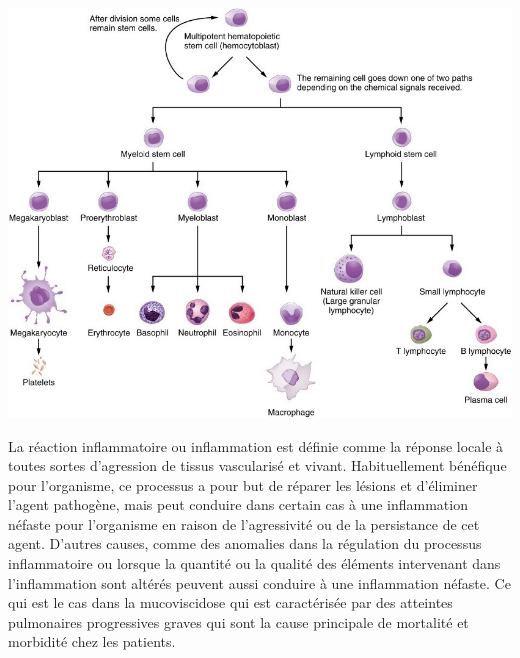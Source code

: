 \begin{center}
\includegraphics[scale=1]{gfx/inflammation.jpg} 
       \label{inflammation}
\end{center}

La réaction inflammatoire ou inflammation est définie comme la réponse locale à toutes sortes d’agression de tissus vascularisé et vivant. Habituellement bénéfique pour l’organisme, ce processus a pour but de réparer les lésions et d’éliminer l’agent pathogène, mais peut conduire dans certain cas à une inflammation néfaste pour l’organisme en raison de l’agressivité ou de la persistance de cet agent. D’autres causes, comme des anomalies dans la régulation du processus inflammatoire ou lorsque la quantité ou la qualité des éléments intervenant dans l’inflammation sont altérés peuvent aussi conduire à une inflammation néfaste. Ce qui est le cas dans la mucoviscidose qui est caractérisée par des atteintes pulmonaires progressives graves qui sont la cause principale de mortalité et morbidité chez les patients.

